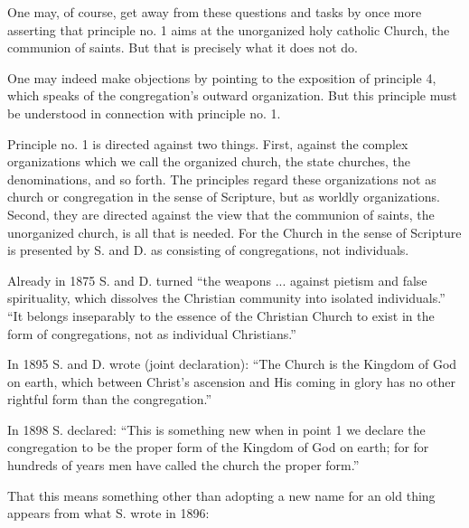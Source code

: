 One may, of course, get away from these questions and tasks by once more asserting that principle no. 1 aims at the unorganized holy catholic Church, the communion of saints. But that is precisely what it does not do.

One may indeed make objections by pointing to the exposition of principle 4, which speaks of the congregation’s outward organization. But this principle must be understood in connection with principle no. 1.

Principle no. 1 is directed against two things. First, against the complex organizations which we call the organized church, the state churches, the denominations, and so forth. The principles regard these organizations not as church or congregation in the sense of Scripture, but as worldly organizations. Second, they are directed against the view that the communion of saints, the unorganized church, is all that is needed. For the Church in the sense of Scripture is presented by S. and D. as consisting of congregations, not individuals.

Already in 1875 S. and D. turned “the weapons ... against pietism and false spirituality, which dissolves the Christian community into isolated individuals.” “It belongs inseparably to the essence of the Christian Church to exist in the form of congregations, not as individual Christians.”

In 1895 S. and D. wrote (joint declaration): “The Church is the Kingdom of God on earth, which between Christ’s ascension and His coming in glory has no other rightful form than the congregation.”

In 1898 S. declared: “This is something new when in point 1 we declare the congregation to be the proper form of the Kingdom of God on earth; for for hundreds of years men have called the church the proper form.”

That this means something other than adopting a new name for an old thing appears from what S. wrote in 1896:

